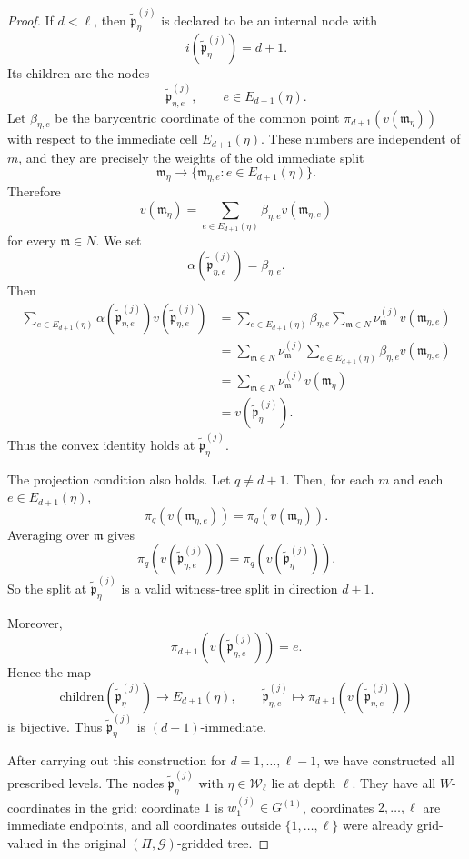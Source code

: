 \documentclass[10pt]{amsart}
\theoremstyle{plain}
\theoremstyle{definition}
\providecommand{\cG}[0]{\ensuremath{\mathcal G}\xspace}
\newcommand{\fm}{\mathfrak{m}}
\newcommand{\fp}{\mathfrak{p}}
\begin{document}
\begin{proof}
If $d<\ell$, then $\widetilde{\fp}^{(j)}_\eta$ is declared to be an internal node
with
\[
  i(\widetilde{\fp}^{(j)}_\eta)=d+1.
\]
Its children are the nodes
\[
  \widetilde{\fp}^{(j)}_{\eta,e},
  \qquad e\in E_{d+1}(\eta).
\]
Let $\beta_{\eta,e}$ be the barycentric coordinate of the common point
$\pi_{d+1}(v(\fm_\eta))$ with respect to the immediate cell
$E_{d+1}(\eta)$.  These numbers are independent of $m$, and they are
precisely the weights of the old immediate split
\[
  \fm_\eta\longrightarrow \{\fm_{\eta,e}:e\in E_{d+1}(\eta)\}.
\]
Therefore
\[
  v(\fm_\eta)
  =
  \sum_{e\in E_{d+1}(\eta)}
  \beta_{\eta,e}v(\fm_{\eta,e})
\]
for every $\fm\in N$.  We set
\[
  \alpha(\widetilde{\fp}^{(j)}_{\eta,e})=\beta_{\eta,e}.
\]
Then
\begin{align*}
  \sum_{e\in E_{d+1}(\eta)}
  \alpha(\widetilde{\fp}^{(j)}_{\eta,e})v(\widetilde{\fp}^{(j)}_{\eta,e})
  &=
  \sum_{e\in E_{d+1}(\eta)}
  \beta_{\eta,e}
  \sum_{\fm\in N}\nu_\fm^{(j)}v(\fm_{\eta,e})       \\
  &=
  \sum_{\fm\in N}\nu_\fm^{(j)}
  \sum_{e\in E_{d+1}(\eta)}
  \beta_{\eta,e}v(\fm_{\eta,e})                 \\
  &=
  \sum_{\fm\in N}\nu_\fm^{(j)}v(\fm_\eta)            \\
  &=
  v(\widetilde{\fp}^{(j)}_\eta).
\end{align*}
Thus the convex identity holds at $\widetilde{\fp}^{(j)}_\eta$.

The projection condition also holds. Let $q\neq d+1$.  Then, for
each $m$ and each $e\in E_{d+1}(\eta)$,
\[
  \pi_q(v(\fm_{\eta,e}))=\pi_q(v(\fm_\eta)).
\]
Averaging over $\fm$ gives
\[
  \pi_q(v(\widetilde{\fp}^{(j)}_{\eta,e}))
  =
  \pi_q(v(\widetilde{\fp}^{(j)}_\eta)).
\]
So the split at $\widetilde{\fp}^{(j)}_\eta$ is a valid witness-tree split in
direction $d+1$.

Moreover,
\[
  \pi_{d+1}(v(\widetilde{\fp}^{(j)}_{\eta,e}))=e.
\]
Hence the map
\[
  \mathrm{children}(\widetilde{\fp}^{(j)}_\eta)\longrightarrow E_{d+1}(\eta),
  \qquad
  \widetilde{\fp}^{(j)}_{\eta,e}\longmapsto
  \pi_{d+1}(v(\widetilde{\fp}^{(j)}_{\eta,e}))
\]
is bijective.  Thus $\widetilde{\fp}^{(j)}_\eta$ is $(d+1)$-immediate.

After carrying out this construction for $d=1,\ldots,\ell-1$, we have
constructed all prescribed levels.  The nodes $\widetilde{\fp}^{(j)}_\eta$ with
$\eta\in\mathcal W_\ell$ lie at depth $\ell$.  They have all
$W$-coordinates in the grid:
coordinate $1$ is $w_1^{(j)}\in G^{(1)}$, coordinates
$2,\ldots,\ell$ are immediate endpoints, and all coordinates outside
$\{1,\ldots,\ell\}$ were already grid-valued in the original
$(\Pi,\cG)$-gridded tree.


\end{proof}
\end{document}
